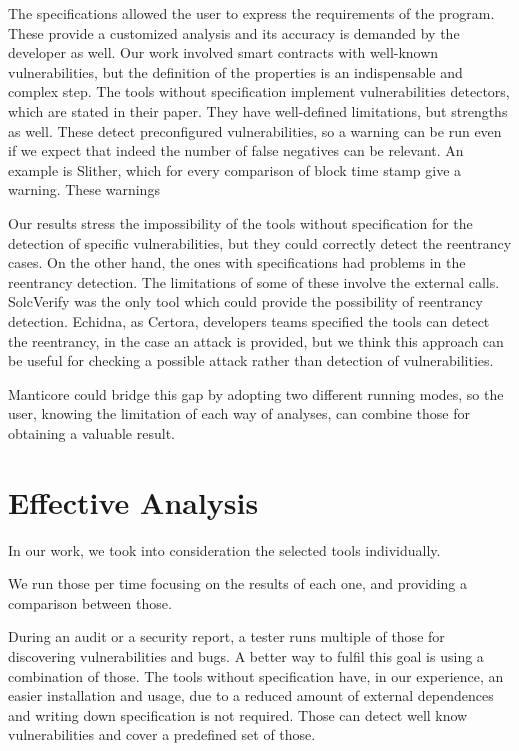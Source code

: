 The specifications allowed the user to express the requirements of the program. These provide a customized analysis and 
its accuracy is demanded by the developer as well. 
Our work involved smart contracts with well-known vulnerabilities, but the definition of the properties is an indispensable and complex step.
The tools without specification implement vulnerabilities detectors, which are stated in their paper. They have well-defined limitations, but strengths as well. These detect preconfigured vulnerabilities, so a warning can be run even if we expect that indeed the number of false negatives can be relevant.
An example is Slither, which for every comparison of block time stamp give a warning. These warnings 

Our results stress the impossibility of the tools without specification for the detection of specific vulnerabilities, but they could correctly detect the reentrancy cases. 
On the other hand, the ones with specifications had problems in the reentrancy detection. The limitations of some of these involve the external calls. 
SolcVerify was the only tool which could provide the possibility of reentrancy detection. Echidna, as Certora, developers teams specified the tools  can detect the reentrancy, in the case an attack is provided, 
but we think this approach can be useful for checking a possible attack rather than detection of vulnerabilities.

Manticore could bridge this gap by adopting two different running modes, so the user, knowing the limitation of each way of analyses, can combine those for obtaining a valuable result.


\section{Effective Analysis}
In our work, we took into consideration the selected tools individually. 

We run those per time focusing on the results of each one, and providing a comparison between those.

During an audit or a security report, a tester runs multiple of those for discovering vulnerabilities and bugs. 
A better way to fulfil this goal is using a combination of those. 
The tools without specification have, in our experience, an easier installation and usage, 
due to a reduced amount of external dependences and writing down specification is not required.
Those can detect well know vulnerabilities and cover a predefined set of those. 

